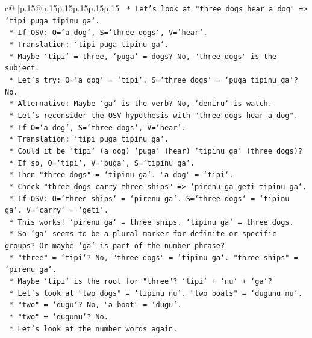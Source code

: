 \documentclass{article}
\begin{document}
{\begin{supertabular}{c@{$\;$}|p{.15\linewidth}@{}p{.15\linewidth}p{.15\linewidth}p{.15\linewidth}p{.15\linewidth}p{.15\linewidth}}
{{{\texttt{        *   Let's look at "three dogs hear a dog" => `tipi puga tipinu ga`.} \\
\texttt{        *   If OSV: O=`a dog`, S=`three dogs`, V=`hear`.} \\
\texttt{        *   Translation: `tipi puga tipinu ga`.} \\
\texttt{        *   Maybe `tipi` = three, `puga` = dogs? No, "three dogs" is the subject.} \\
\texttt{        *   Let's try: O=`a dog` = `tipi`. S=`three dogs` = `puga tipinu ga`? No.} \\
\texttt{        *   Alternative: Maybe `ga` is the verb? No, `deniru` is watch.} \\
\texttt{        *   Let's reconsider the OSV hypothesis with "three dogs hear a dog".} \\
\texttt{        *   If O=`a dog`, S=`three dogs`, V=`hear`.} \\
\texttt{        *   Translation: `tipi puga tipinu ga`.} \\
\texttt{        *   Could it be `tipi` (a dog) `puga` (hear) `tipinu ga` (three dogs)?} \\
\texttt{        *   If so, O=`tipi`, V=`puga`, S=`tipinu ga`.} \\
\texttt{        *   Then "three dogs" = `tipinu ga`. "a dog" = `tipi`.} \\
\texttt{        *   Check "three dogs carry three ships" => `pirenu ga geti tipinu ga`.} \\
\texttt{        *   If OSV: O=`three ships` = `pirenu ga`. S=`three dogs` = `tipinu ga`. V=`carry` = `geti`.} \\
\texttt{        *   This works! `pirenu ga` = three ships. `tipinu ga` = three dogs.} \\
\texttt{        *   So `ga` seems to be a plural marker for definite or specific groups? Or maybe `ga` is part of the number phrase?} \\
\texttt{        *   "three" = `tipi`? No, "three dogs" = `tipinu ga`. "three ships" = `pirenu ga`.} \\
\texttt{        *   Maybe `tipi` is the root for "three"? `tipi` + `nu` + `ga`?} \\
\texttt{        *   Let's look at "two dogs" = `tipinu nu`. "two boats" = `dugunu nu`.} \\
\texttt{        *   "two" = `dugu`? No, "a boat" = `dugu`.} \\
\texttt{        *   "two" = `dugunu`? No.} \\
\texttt{        *   Let's look at the number words again.} \\
}}}
\end{supertabular}}
\end{document}
